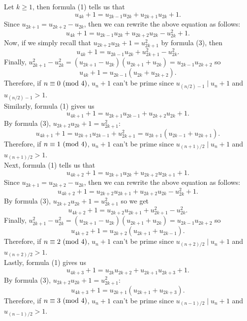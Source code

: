 \begin{solution}
    Let $k \geq 1$, then formula (1) tells us that 
    $$u_{4k} + 1 = u_{2k - 1}u_{2k} + u_{2k + 1}u_{2k} + 1.$$
    Since $u_{2k + 1} = u_{2k + 2} - u_{2k}$, then we can rewrite the above equation as follows:
    $$u_{4k} + 1 = u_{2k - 1}u_{2k} + u_{2k + 2}u_{2k} - u_{2k}^2 + 1.$$
    Now, if we simply recall that $u_{2k + 2}u_{2k} + 1 = u_{2k + 1}^2$ by formula (3), then
    $$u_{4k} + 1 = u_{2k - 1}u_{2k} + u_{2k + 1}^2 - u_{2k}^2.$$
    Finally, $u_{2k + 1}^2 - u_{2k}^2 = (u_{2k + 1} - u_{2k})(u_{2k + 1} + u_{2k}) = u_{2k - 1}u_{2k+2}$ so
    $$u_{4k} + 1 = u_{2k - 1}(u_{2k} + u_{2k+2}).$$
    Therefore, if $n \equiv 0 \ (\mathrm{mod}\ 4)$, $u_n + 1$ can't be prime since $u_{(n/2) - 1} \mid u_n + 1$ and $u_{(n/2) - 1} > 1$.\\
    
    Similarly, formula (1) gives us
    $$u_{4k + 1} + 1 = u_{2k + 1}u_{2k - 1} + u_{2k + 2}u_{2k} + 1.$$
    By formula (3), $u_{2k + 2}u_{2k} + 1 = u_{2k + 1}^2$:
    $$u_{4k + 1} + 1 = u_{2k + 1}u_{2k - 1} + u_{2k+1}^2 = u_{2k + 1}(u_{2k - 1} + u_{2k+1}).$$
    Therefore, if $n \equiv 1 \ (\mathrm{mod}\ 4)$, $u_n + 1$ can't be prime since $u_{(n+1)/2} \mid u_n + 1$ and $u_{(n+1)/2} > 1$.\\
    
    Next, formula (1) tells us that 
    $$u_{4k + 2} + 1 = u_{2k + 1}u_{2k} + u_{2k + 2}u_{2k + 1} + 1.$$
    Since $u_{2k + 1} = u_{2k + 2} - u_{2k}$, then we can rewrite the above equation as follows:
    $$u_{4k + 2} + 1 = u_{2k + 2}u_{2k + 1} + u_{2k + 2}u_{2k} - u_{2k}^2 + 1.$$
    By formula (3), $u_{2k + 2}u_{2k} + 1 = u_{2k + 1}^2$ so we get
    $$u_{4k + 2} + 1 = u_{2k + 2}u_{2k + 1} + u_{2k + 1}^2 - u_{2k}^2.$$
    Finally, $u_{2k + 1}^2 - u_{2k}^2 = (u_{2k + 1} - u_{2k})(u_{2k + 1} + u_{2k}) = u_{2k - 1}u_{2k+2}$ so
    $$u_{4k + 2} + 1 = u_{2k + 2}(u_{2k+1} + u_{2k-1}).$$
    Therefore, if $n \equiv 2 \ (\mathrm{mod}\ 4)$, $u_n + 1$ can't be prime since $u_{(n + 2)/2} \mid u_n + 1$ and $u_{(n + 2)/2} > 1$. \\

    Lastly, formula (1) gives us
    $$u_{4k + 3} + 1 = u_{2k}u_{2k + 2} + u_{2k + 1}u_{2k + 3} + 1.$$
    By formula (3), $u_{2k + 2}u_{2k} + 1 = u_{2k + 1}^2$:
    $$u_{4k + 3} + 1 = u_{2k + 1}(u_{2k + 1} + u_{2k+3}).$$
    Therefore, if $n \equiv 3 \ (\mathrm{mod}\ 4)$, $u_n + 1$ can't be prime since $u_{(n-1)/2} \mid u_n + 1$ and $u_{(n-1)/2} > 1$. \\
\end{solution}

